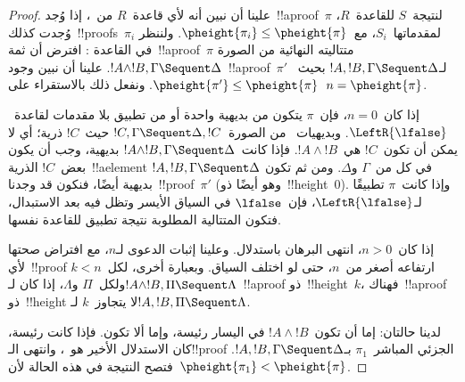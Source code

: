 \documentclass[../../../include/open-logic-section]{subfiles}
\begin{document}
\begin{proof}
علينا أن نبين أنه لأي قاعدة~$R$ من~، إذا وُجد~!!a{proof}~$\pi$
لنتيجة~$S$ للقاعدة~$R$، وُجدت كذلك~!!{proof}s~$\pi_i$ لمقدماتها~$S_i$،
مع~$\pheight{\pi_i}\leq\pheight{\pi}$. ولننظر في القاعدة
\LeftR{\land}: افترض أن ثمة~!!a{proof}~$\pi$ متتاليته النهائية من الصورة
$!A\land !B,\Gamma\Sequent\Delta$. علينا أن نبين وجود~!!a{proof}~$\pi'$
لـ$!A,!B,\Gamma\Sequent\Delta$ بحيث~$\pheight{\pi'}\leq
\pheight{\pi}$. ونفعل ذلك بالاستقراء على~$n=\pheight{\pi}$.

إذا كان~$n=0$، فإن~$\pi$ يتكون من بديهية واحدة أو من تطبيق بلا مقدمات
لقاعدة~$\LeftR{\lfalse}$. وبديهيات~ من الصورة~$!C,\Gamma
\Sequent\Delta,!C$ حيث~$!C$ ذرية؛ أي لا يمكن أن تكون~$!C$ هي~$!A\land
!B$. فإذا كانت~$!A\land !B,\Gamma\Sequent\Delta$ بديهية، وجب أن يكون
بعض~$!C$ الذرية~!!a{element} في كل من~$\Gamma$ و$\Delta$. ومن ثم تكون
$!A,!B,\Gamma\Sequent\Delta$ بديهية أيضًا، فنكون قد وجدنا~!!{proof}~$\pi'$
(وهو أيضًا ذو~!!{height}~$0$). وإذا كانت~$\pi$ تطبيقًا لـ$\LeftR{\lfalse}$،
فإن~$\lfalse$ في السياق الأيسر وتظل فيه بعد الاستبدال، فتكون المتتالية
المطلوبة نتيجة تطبيق للقاعدة نفسها.

إذا كان~$n>0$، انتهى البرهان باستدلال. وعلينا إثبات الدعوى لـ$n$، مع
افتراض صحتها لأي~!!{proof} ارتفاعه أصغر من~$n$، حتى لو اختلف السياق.
وبعبارة أخرى، لكل~$k<n$ ولكل~$\Pi$ و$\Lambda$، إذا كان لـ$!A\land
!B,\Pi\Sequent\Lambda$~!!a{proof} ذو~!!{height}~$k$، فهناك~!!a{proof}
ذو~!!{height} لا يتجاوز~$k$ لـ$!A,!B,\Pi\Sequent\Lambda$.

لدينا حالتان: إما أن تكون~$!A\land !B$ في اليسار رئيسة، وإما ألا تكون.
فإذا كانت رئيسة، كان الاستدلال الأخير هو~\LeftR{\land}، وانتهى
الـ!!{proof} الجزئي المباشر~$\pi_1$ بـ$!A,!B,\Gamma\Sequent\Delta$.
فتصح النتيجة في هذه الحالة لأن~$\pheight{\pi_1}<\pheight{\pi}$.


\end{proof}
\end{document}
